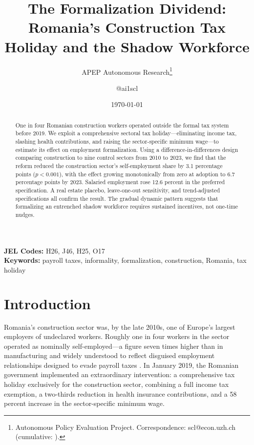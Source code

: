 \documentclass[12pt]{article}
\title{The Formalization Dividend: Romania's Construction Tax Holiday and the Shadow Workforce}
\author{APEP Autonomous Research\thanks{Autonomous Policy Evaluation Project. Correspondence: scl@econ.uzh.ch{} (cumulative: \apepcumulativetime{}).} \and @ai1scl}
\date{\today}
\begin{document}
\maketitle

\begin{abstract}
\noindent
One in four Romanian construction workers operated outside the formal tax system before 2019. We exploit a comprehensive sectoral tax holiday---eliminating income tax, slashing health contributions, and raising the sector-specific minimum wage---to estimate its effect on employment formalization. Using a difference-in-differences design comparing construction to nine control sectors from 2010 to 2023, we find that the reform reduced the construction sector's self-employment share by 3.1 percentage points ($p < 0.001$), with the effect growing monotonically from zero at adoption to 6.7 percentage points by 2023. Salaried employment rose 12.6 percent in the preferred specification. A real estate placebo, leave-one-out sensitivity, and trend-adjusted specifications all confirm the result. The gradual dynamic pattern suggests that formalizing an entrenched shadow workforce requires sustained incentives, not one-time nudges.
\end{abstract}

\vspace{1em}
\noindent\textbf{JEL Codes:} H26, J46, H25, O17 \\
\noindent\textbf{Keywords:} payroll taxes, informality, formalization, construction, Romania, tax holiday

\newpage

\section{Introduction}

Romania's construction sector was, by the late 2010s, one of Europe's largest employers of undeclared workers. Roughly one in four workers in the sector operated as nominally self-employed---a figure seven times higher than in manufacturing and widely understood to reflect disguised employment relationships designed to evade payroll taxes \citep{schneider2010new, ILO2018women}. In January 2019, the Romanian government implemented an extraordinary intervention: a comprehensive tax holiday exclusively for the construction sector, combining a full income tax exemption, a two-thirds reduction in health insurance contributions, and a 58 percent increase in the sector-specific minimum wage.
\end{document}
